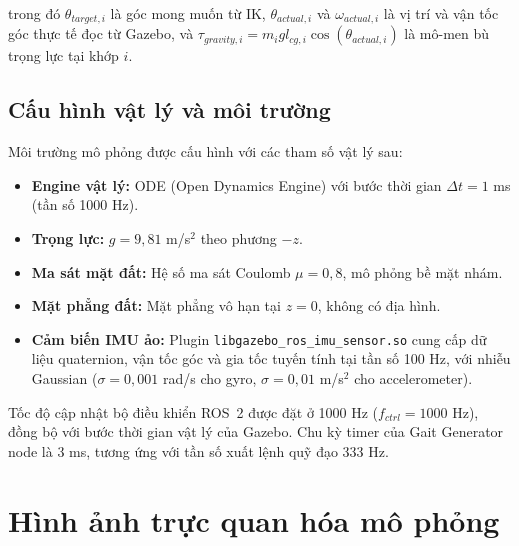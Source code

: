 trong đó $\theta_{target,i}$ là góc mong muốn từ IK, $\theta_{actual,i}$ và $\omega_{actual,i}$ là vị trí và vận tốc góc thực tế đọc từ Gazebo, và $\tau_{gravity,i} = m_i g l_{cg,i} \cos(\theta_{actual,i})$ là mô-men bù trọng lực tại khớp $i$.

\subsection{Cấu hình vật lý và môi trường}

Môi trường mô phỏng được cấu hình với các tham số vật lý sau:

\begin{itemize}
    \item \textbf{Engine vật lý:} ODE (Open Dynamics Engine) với bước thời gian $\Delta t = 1$ ms (tần số 1000 Hz).
    \item \textbf{Trọng lực:} $g = 9{,}81$ m/s$^2$ theo phương $-z$.
    \item \textbf{Ma sát mặt đất:} Hệ số ma sát Coulomb $\mu = 0{,}8$, mô phỏng bề mặt nhám.
    \item \textbf{Mặt phẳng đất:} Mặt phẳng vô hạn tại $z = 0$, không có địa hình.
    \item \textbf{Cảm biến IMU ảo:} Plugin \texttt{libgazebo\_ros\_imu\_sensor.so} cung cấp dữ liệu quaternion, vận tốc góc và gia tốc tuyến tính tại tần số 100 Hz, với nhiễu Gaussian ($\sigma = 0{,}001$ rad/s cho gyro, $\sigma = 0{,}01$ m/s$^2$ cho accelerometer).
\end{itemize}

Tốc độ cập nhật bộ điều khiển ROS~2 được đặt ở 1000 Hz ($f_{ctrl} = 1000$ Hz), đồng bộ với bước thời gian vật lý của Gazebo. Chu kỳ timer của Gait Generator node là 3 ms, tương ứng với tần số xuất lệnh quỹ đạo 333 Hz.

\section{Hình ảnh trực quan hóa mô phỏng}

